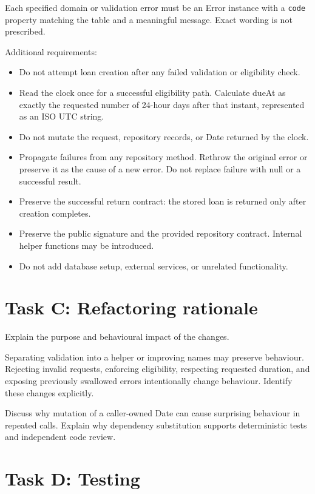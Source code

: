 \documentclass[
  11pt,
]{article}
\newcommand{\passthrough}[1]{#1}
\providecommand{\tightlist}{%
  \setlength{\itemsep}{0pt}\setlength{\parskip}{0pt}}
\begin{document}
Each specified domain or validation error must be an Error instance with
a \passthrough{\lstinline!code!} property matching the table and a
meaningful message. Exact wording is not prescribed.

Additional requirements:

\begin{itemize}
\tightlist
\item
  Do not attempt loan creation after any failed validation or
  eligibility check.
\item
  Read the clock once for a successful eligibility path. Calculate dueAt
  as exactly the requested number of 24-hour days after that instant,
  represented as an ISO UTC string.
\item
  Do not mutate the request, repository records, or Date returned by the
  clock.
\item
  Propagate failures from any repository method. Rethrow the original
  error or preserve it as the cause of a new error. Do not replace
  failure with null or a successful result.
\item
  Preserve the successful return contract: the stored loan is returned
  only after creation completes.
\item
  Preserve the public signature and the provided repository contract.
  Internal helper functions may be introduced.
\item
  Do not add database setup, external services, or unrelated
  functionality.
\end{itemize}

\hypertarget{task-c-refactoring-rationale}{%
\section{Task C: Refactoring
rationale}\label{task-c-refactoring-rationale}}

Explain the purpose and behavioural impact of the changes.

Separating validation into a helper or improving names may preserve
behaviour. Rejecting invalid requests, enforcing eligibility, respecting
requested duration, and exposing previously swallowed errors
intentionally change behaviour. Identify these changes explicitly.

Discuss why mutation of a caller-owned Date can cause surprising
behaviour in repeated calls. Explain why dependency substitution
supports deterministic tests and independent code review.

\hypertarget{task-d-testing}{%
\section{Task D: Testing}\label{task-d-testing}}
\end{document}
